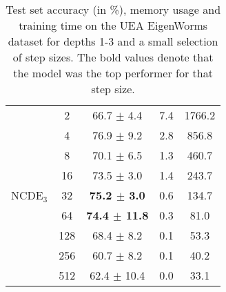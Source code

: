 \begin{table}[t]
\begin{center}
\begin{tabular}{ccccc}
          & 2    &   66.7 $\pm$ 4.4 &           7.4 &        1766.2 \\
          & 4    &   76.9 $\pm$ 9.2 &           2.8 &         856.8 \\
          & 8    &   70.1 $\pm$ 6.5 &           1.3 &         460.7 \\
          & 16   &   73.5 $\pm$ 3.0 &           1.4 &         243.7 \\
        NCDE$_3$  & 32   &   \textbf{75.2 $\pm$ 3.0} &           0.6 &         134.7 \\
          & 64   &  \textbf{74.4 $\pm$ 11.8} &           0.3 &          81.0 \\
          & 128  &   68.4 $\pm$ 8.2 &           0.1 &          53.3 \\
          & 256  &   60.7 $\pm$ 8.2 &           0.1 &          40.2 \\
          & 512  &  62.4 $\pm$ 10.4 &           0.0 &          33.1 \\
        \bottomrule
        \end{tabular}
    \end{center}
    \caption{Test set accuracy (in \%), memory usage and training time on the UEA EigenWorms dataset for depths 1-3 and a small selection of step sizes. The bold values denote that the model was the top performer for that step size.}
    \label{tab:eigenworms_all}
\end{table}